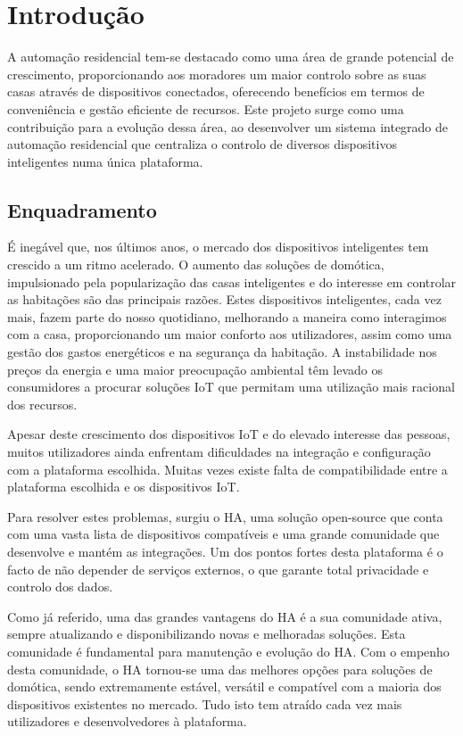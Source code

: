 \chapter{Introdução}\label{cap:intro}


A automação residencial tem-se destacado como uma área de grande potencial de crescimento, proporcionando aos moradores um maior controlo sobre as suas casas através de dispositivos conectados, oferecendo benefícios em termos de conveniência e gestão eficiente de recursos. Este projeto surge como uma contribuição para a evolução dessa área, ao desenvolver um sistema integrado de automação residencial que centraliza o controlo de diversos dispositivos inteligentes numa única plataforma.

\section{Enquadramento}

É inegável que, nos últimos anos, o mercado dos dispositivos inteligentes tem crescido a um ritmo acelerado. O aumento das soluções de domótica, impulsionado pela popularização das casas inteligentes e do interesse em controlar as habitações são das principais razões. Estes dispositivos inteligentes, cada vez mais, fazem parte do nosso quotidiano, melhorando a maneira como interagimos com a casa, proporcionando um maior conforto aos utilizadores, assim como uma gestão dos gastos energéticos e na segurança da habitação.
A instabilidade nos preços da energia e uma maior preocupação ambiental têm levado os consumidores a procurar soluções \gls{IoT} que permitam uma utilização mais racional dos recursos.

Apesar deste crescimento dos dispositivos \gls{IoT} e do elevado interesse das pessoas, muitos utilizadores ainda enfrentam dificuldades na integração e configuração com a plataforma escolhida. Muitas vezes existe falta de compatibilidade entre a plataforma escolhida e os dispositivos \gls{IoT}.

Para resolver estes problemas, surgiu o \gls{HA}, uma solução open-source que conta com uma vasta lista de dispositivos compatíveis e uma grande comunidade que desenvolve e mantém as integrações. Um dos pontos fortes desta plataforma é o facto de não depender de serviços externos, o que garante total privacidade e controlo dos dados.

Como já referido, uma das grandes vantagens do \gls{HA} é a sua comunidade ativa, sempre atualizando e disponibilizando novas e melhoradas soluções. Esta comunidade é fundamental para manutenção e evolução do \gls{HA}. Com o empenho desta comunidade, o \gls{HA} tornou-se uma das melhores opções para soluções de domótica, sendo extremamente estável, versátil e compatível com a maioria dos dispositivos existentes no mercado. Tudo isto tem atraído cada vez mais utilizadores e desenvolvedores à plataforma.



